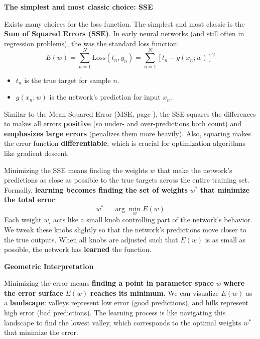 \begin{flushleft}
    \textcolor{Green3}{ \textbf{The simplest and most classic choice: SSE}}
\end{flushleft}
Exists many choices for the loss function. The simplest and most classic is the \textbf{Sum of Squared Errors (SSE)}. In early neural networks (and still often in regression problems), the  was the standard loss function:
\begin{equation}\label{eq:sse-loss-function}
    E(w) = \displaystyle\sum_{n=1}^{N} \text{Loss}(t_{n}, y_{n}) = \displaystyle\sum_{n=1}^{N} \left[t_{n} - g\left(x_{n}; w\right)\right]^{2}
\end{equation}
\begin{itemize}
    \item $t_{n}$ is the true target for sample $n$.
    \item $g\left(x_{n}; w\right)$ is the network's prediction for input $x_{n}$.
\end{itemize}
Similar to the Mean Squared Error (MSE, page \pageref{eq:mse}), the SSE squares the differences to makes all errors \textbf{positive} (so under- and over-predictions both count) and \textbf{emphasizes large errors} (penalizes them more heavily). Also, squaring makes the error function \textbf{differentiable}, which is crucial for optimization algorithms like gradient descent.

\highspace
Minimizing the SSE means finding the weights $w$ that make the network's predictions as close as possible to the true targets across the entire training set. Formally, \textbf{learning becomes finding the set of weights} $w^{*}$ \textbf{that minimize the total error}:
\begin{equation}\label{eq:optimal-weights}
    w^{*} = \arg\min_w E(w)
\end{equation}
Each weight $w_{i}$ acts like a small knob controlling part of the network's behavior. We tweak these knobs slightly so that the network's predictions move closer to the true outputs. When all knobs are adjusted such that $E(w)$ is as small as possible, the network has \textbf{learned} the function.

\highspace
\begin{flushleft}
    \textcolor{Green3}{ \textbf{Geometric Interpretation}}
\end{flushleft}
Minimizing the error means \textbf{finding a point in parameter space} $w$ \textbf{where the error surface} $E(w)$ \textbf{reaches its minimum}. We can visualize $E(w)$ as a \textbf{landscape}: valleys represent low error (good predictions), and hills represent high error (bad predictions). The learning process is like navigating this landscape to find the lowest valley, which corresponds to the optimal weights $w^{*}$ that minimize the error.


